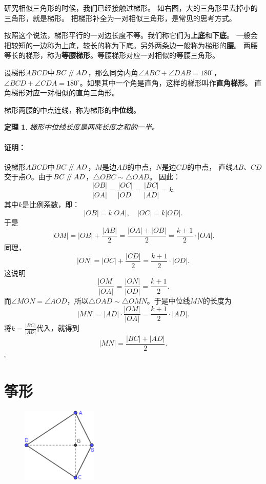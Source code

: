 \documentclass[12pt,UTF8]{ctexbook}
\newtheorem{tm}{定理}[section]
\newenvironment{proof2}{\paragraph{\textbf{证明：}}}{\hfill$\square$}
\renewcommand\parallel{\mathrel{/\mskip-4mu/}}
\begin{document}
研究相似三角形的时候，我们已经接触过梯形。
如右图，大的三角形里去掉小的三角形，就是梯形。
把梯形补全为一对相似三角形，是常见的思考方式。

按照这个说法，梯形平行的一对边长度不等。我们称它们为\textbf{上底}和\textbf{下底}。
一般会把较短的一边称为上底，较长的称为下底。另外两条边一般称为梯形的\textbf{腰}。
两腰等长的梯形，称为\textbf{等腰梯形}。等腰梯形对应一对相似的等腰三角形。

设梯形$ABCD$中$BC \parallel AD$，那么同旁内角$\angle ABC + \angle DAB = 180^\circ$，
$\angle BCD + \angle CDA = 180^\circ$。如果其中一个角是直角，这样的梯形叫作\textbf{直角梯形}。
直角梯形对应一对相似的直角三角形。

梯形两腰的中点连线，称为梯形的\textbf{中位线}。
\begin{tm}\label{tm:0-2-20}
    梯形中位线长度是两底长度之和的一半。
\end{tm}
\begin{proof2}
    设梯形$ABCD$中$BC \parallel AD$，$M$是边$AB$的中点，$N$是边$CD$的中点，
    直线$AB$、$CD$交于点$O$。由于$BC \parallel AD$，$\triangle OBC \sim \triangle OAD$。
    因此：
    $$ \frac{|OB|}{|OA|} = \frac{|OC|}{|OD|} = \frac{|BC|}{|AD|} = k.$$
    其中$k$是比例系数，即：
    $$ |OB| = k|OA|, \quad |OC| = k|OD|.$$
    于是
    $$ |OM| = |OB| + \frac{|AB|}{2} = \frac{|OA| + |OB|}{2} = \frac{k+1}{2} \cdot|OA|.$$
    同理，
    $$ |ON| = |OC| + \frac{|CD|}{2} = \frac{k+1}{2}\cdot|OD|. $$
    这说明
    $$ \frac{|OM|}{|OA|} = \frac{|ON|}{|OD|} = \frac{k+1}{2}. $$
    而$\angle MON = \angle AOD$，所以$\triangle OAD \sim \triangle OMN$。于是中位线$MN$的长度为
    $$ |MN| = |AD| \cdot \frac{|OM|}{|OA|} = \frac{k+1}{2}\cdot|AD|. $$
    将$k = \frac{|BC|}{|AD|}$代入，就得到
    $$ |MN| = \frac{|BC| + |AD|}{2}. $$
\end{proof2}

\section{筝形}

\begin{figure} %
    \vspace{-5pt}
    \centering
    \includegraphics[width=0.32\textwidth]{tu/筝形1.png}
\end{figure}
\end{document}
